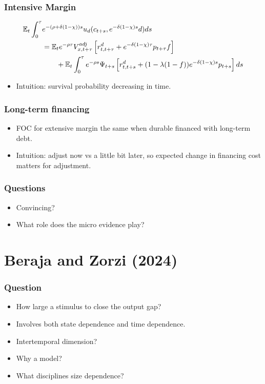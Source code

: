 \documentclass[english,xcolor=svgnames]{beamer}
\begin{document}
\begin{frame}
    \frametitle{Intensive Margin}
\begin{align*}
		\mathbb{E}_t\int_0^{\tau} &e^{-(\rho+\delta(1-\chi)) s} u_d(c_{t+s},e^{-\delta(1-\chi) s}d)ds \\
		&=   \mathbb{E}_t e^{-\rho \tau}V_{x,t+\tau}^{adj}\left[r^d_{t,t+\tau}  + e^{-\delta(1-\chi) \tau}p_{t+\tau} f\right] \\
		& \qquad + \mathbb{E}_t\int_0^{\tau}e^{-\rho s}\Psi_{t+s}\left[r^d_{t,t+s} + (1-\lambda(1-f))e^{-\delta(1-\chi)s}p_{t+s}\right]ds \\
	\end{align*}
\begin{itemize}
	\item Intuition: survival probability decreasing in time.
\end{itemize}
\end{frame}

\begin{frame}
    \frametitle{Long-term financing}
\begin{itemize}
	\item FOC for extensive margin the same when durable financed with long-term debt.
	\item Intuition: adjust now vs a little bit later, so expected change in financing cost matters for adjustment.
\end{itemize}
\end{frame}

\begin{frame}
    \frametitle{Questions}
	\begin{itemize}
		\item Convincing?
		\item What role does the micro evidence play?
	\end{itemize}
\end{frame}

\section{Beraja and Zorzi (2024)}

\begin{frame}
    \frametitle{Question}
	\begin{itemize}
		\item How large a stimulus to close the output gap?
		\item Involves both state dependence and time dependence.
		\item Intertemporal dimension?
		\item Why a model?
		\item What disciplines size dependence?
	\end{itemize}
\end{frame}
\end{document}
